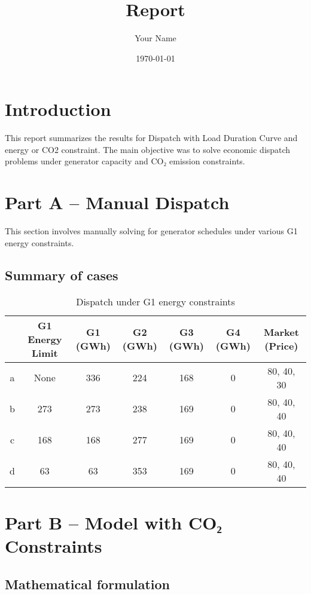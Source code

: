 \documentclass{report}
\title{ Report}
\author{Your Name}
\date{\today}
\begin{document}
\maketitle

\tableofcontents

\chapter{Introduction}

This report summarizes the results for Dispatch with Load Duration Curve and energy or CO2 constraint. The main objective was to solve economic dispatch problems under generator capacity and CO₂ emission constraints.

\chapter{Part A -- Manual Dispatch}

This section involves manually solving for generator schedules under various G1 energy constraints.

\section{Summary of cases}

\begin{table}[h]
\centering
\begin{tabular}{|c|c|c|c|c|c|c|}
\hline
 & G1 Energy Limit & G1 (GWh) & G2 (GWh) & G3 (GWh) & G4 (GWh) & Market (Price) \\
\hline
a & None & 336 & 224 & 168 & 0 & 80, 40, 30 \\
b &  273 &  273 & 238 & 169 & 0 & 80, 40, 40 \\
c &  168 &  168 & 277 & 169 & 0 & 80, 40, 40 \\
d &   63 &   63 & 353 & 169 & 0 & 80, 40, 40 \\
\hline
\end{tabular}
\caption{Dispatch under G1 energy constraints}
\end{table}

\chapter{Part B -- Model with CO₂ Constraints}

\section{Mathematical formulation}
\end{document}
